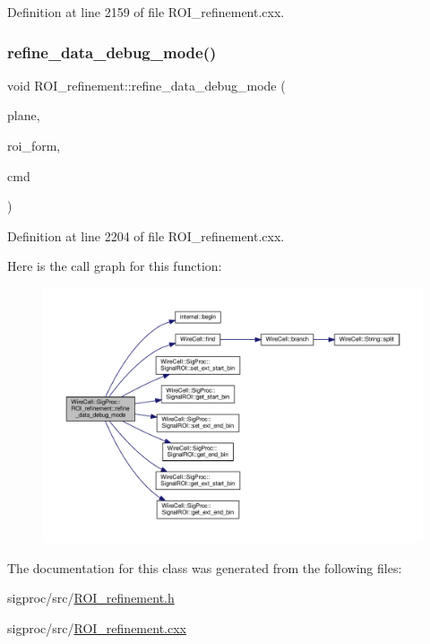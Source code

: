 Definition at line 2159 of file R\+O\+I\+\_\+refinement.\+cxx.

\mbox{\label{class_wire_cell_1_1_sig_proc_1_1_r_o_i__refinement_ab63807936f9a429bf0d97b133068bd4a}} 
\subsubsection{\texorpdfstring{refine\+\_\+data\+\_\+debug\+\_\+mode()}{refine\_data\_debug\_mode()}}
{\footnotesize\ttfamily void R\+O\+I\+\_\+refinement\+::refine\+\_\+data\+\_\+debug\+\_\+mode (\begin{DoxyParamCaption}\item[{int}]{plane,  }\item[{\hyperlink{class_wire_cell_1_1_sig_proc_1_1_r_o_i__formation}{R\+O\+I\+\_\+formation} \&}]{roi\+\_\+form,  }\item[{const std\+::string \&}]{cmd }\end{DoxyParamCaption})}



Definition at line 2204 of file R\+O\+I\+\_\+refinement.\+cxx.

Here is the call graph for this function\+:
\nopagebreak
\begin{figure}[H]
\begin{center}
\leavevmode
\includegraphics[width=350pt]{class_wire_cell_1_1_sig_proc_1_1_r_o_i__refinement_ab63807936f9a429bf0d97b133068bd4a_cgraph}
\end{center}
\end{figure}


The documentation for this class was generated from the following files\+:\begin{DoxyCompactItemize}
\item 
sigproc/src/\hyperlink{_r_o_i__refinement_8h}{R\+O\+I\+\_\+refinement.\+h}\item 
sigproc/src/\hyperlink{_r_o_i__refinement_8cxx}{R\+O\+I\+\_\+refinement.\+cxx}\end{DoxyCompactItemize}
